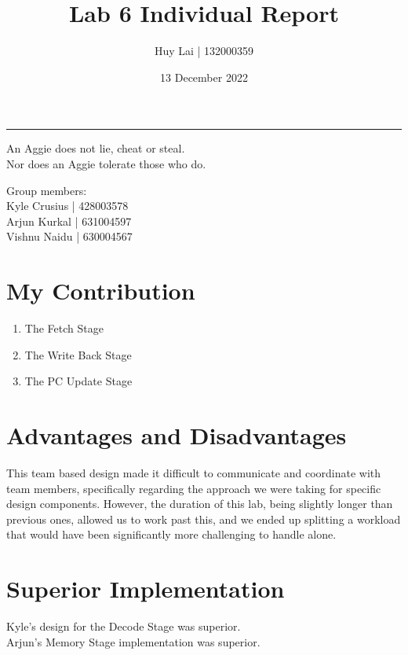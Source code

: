 \documentclass[fleqn,12pt]{article}
\title{\vspace{-2.5cm}Lab 6 Individual Report}
\author{
    Huy Lai | 132000359
}
\affil{Texas A\&M University}
\date{\vspace{-28pt}13 December 2022}
\begin{document}
\maketitle
\begin{center}
\vspace{-42pt}
\rule{\textwidth}{.1pt}
{\large
An Aggie does not lie, cheat or steal.\\
Nor does an Aggie tolerate those who do.
}
\end{center}
\begin{center}
Group members:\\
Kyle Crusius | 428003578\\
Arjun Kurkal | 631004597\\
Vishnu Naidu | 630004567
\end{center}

\section*{My Contribution}
\begin{enumerate}
    \item The Fetch Stage
    \item The Write Back Stage
    \item The PC Update Stage
\end{enumerate}

\section*{Advantages and Disadvantages}
\noindent
This team based design made it difficult to communicate and coordinate with team members, specifically regarding the approach we were taking for specific design components. However, the duration of this lab, being slightly longer than previous ones, allowed us to work past this, and we ended up splitting a workload that would have been significantly more challenging to handle alone.

\section*{Superior Implementation}
\noindent
Kyle's design for the Decode Stage was superior.\\
Arjun's Memory Stage implementation was superior.
\end{document}
